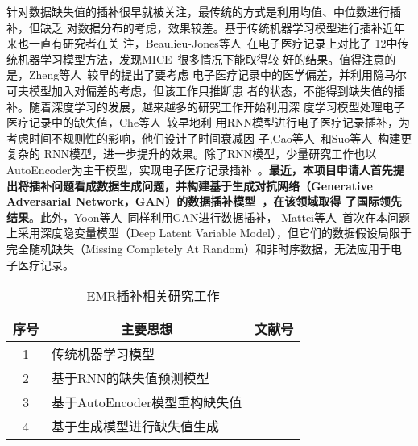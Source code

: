 针对数据缺失值的插补很早就被关注，最传统的方式是利用均值、中位数进行插补，但缺乏
对数据分布的考虑，效果较差。基于传统机器学习模型进行插补近年来也一直有研究者在关
注，Beaulieu-Jones等人~在电子医疗记录上对比了
12中传统机器学习模型方法，发现MICE~很多情况下能取得较
好的结果。值得注意的是，Zheng等人~较早的提出了要考虑
电子医疗记录中的医学偏差，并利用隐马尔可夫模型加入对偏差的考虑，但该工作只推断患
者的状态，不能得到缺失值的插补。随着深度学习的发展，越来越多的研究工作开始利用深
度学习模型处理电子医疗记录中的缺失值，Che等人~较早地利
用RNN模型进行电子医疗记录插补，为考虑时间不规则性的影响，他们设计了时间衰减因
子,Cao等人~和Suo等人~构建更复杂的
RNN模型，进一步提升\cite{che2018recurrent}的效果。除了RNN模型，少量研究工作也以
AutoEncoder为主干模型，实现电子医疗记录插补~。\textbf{最近，本项目申请人首先提
出将插补问题看成数据生成问题，并构建基于生成对抗网络（Generative Adversarial
Network，GAN）的数据插补模型~，在该领域取得
了国际领先结果}。此外，Yoon等人~同样利用GAN进行数据插补，
Mattei等人~首次在本问题上采用深度隐变量模型（Deep Latent
Variable Model），但它们的数据假设局限于完全随机缺失（Missing Completely At
Random）和非时序数据，无法应用于电子医疗记录。

\begin{table}
    \renewcommand\arraystretch{1.5}
    \begin{small}
        \caption{EMR插补相关研究工作}
        \label{tab:imputation}
        \begin{center}
            \begin{tabular}[c]{cll}
                \toprule
                \multicolumn{1}{c}{\textbf{序号}} &
                \multicolumn{1}{c}{\textbf{主要思想}} &
                \multicolumn{1}{c}{\textbf{文献号}}\\
                \midrule
                1 & 传统机器学习模型 & \cite{zheng2017resolving}
                \cite{beaulieu2018characterizing} \cite{yang2018time} \cite{xu2019estimating} \cite{sterne2009multiple}
                \\
                2 & 基于RNN的缺失值预测模型 &
                \cite{che2018recurrent} \cite{suo2019recurrent}
                ~\cite{cao2018brits} \\
                3 & 基于AutoEncoder模型重构缺失值 & \cite{beaulieu2017missing}
                \cite{costa2018missing} \\
                4 & 基于生成模型进行缺失值生成 & \cite{luo2018multivariate}
                \cite{luo20192} \cite{yoon2018gain} \cite{mattei2019miwae} \\
               \bottomrule
            \end{tabular}
        \end{center}
    \end{small}
\end{table}

